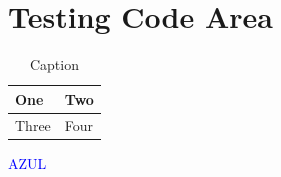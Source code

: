 \chapter{Testing Code Area}
\begin{table}[H]
	\caption{Caption}
	\label{Label}
	\begin{center}
		\begin{tabular}{||l|l||}\hline
			One & Two \\\hline
			Three & Four \\\hline
		\end{tabular}
	\end{center}
\end{table}
\vspace{1cm}
\begin{figure}[H]
\end{figure}
\textcolor{blue}{AZUL}
